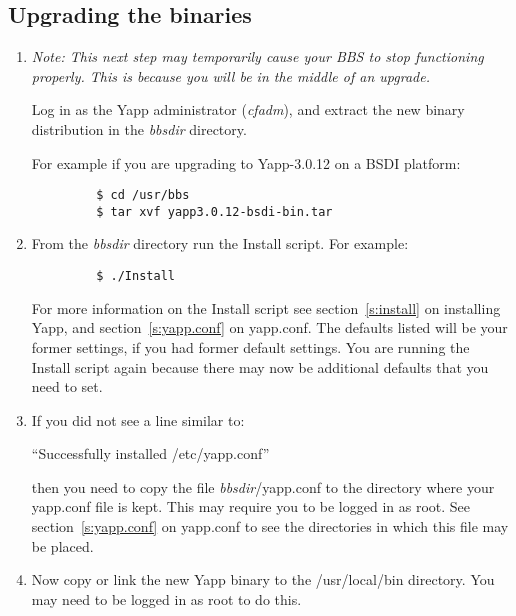 \documentclass[twoside]{report}
\begin{document}
   \subsection{Upgrading the binaries}
      \begin{enumerate}
      \item {\em Note: This next step may temporarily cause your BBS to stop
         functioning properly.  This is because you will be in the middle 
         of an upgrade.}
   
         Log in as the Yapp administrator ({\em cfadm}), and extract the
         new binary distribution in the {\it bbsdir} directory.
   
         For example if you are upgrading to Yapp-3.0.12 on a BSDI platform:
         \begin{verbatim}
         $ cd /usr/bbs
         $ tar xvf yapp3.0.12-bsdi-bin.tar
         \end{verbatim}
         \vspace{-12pt}
   
      \item From the {\em bbsdir} directory run the Install script.  
         For example:
         \begin{verbatim}
         $ ./Install
         \end{verbatim}
         \vspace{-12pt}
   
         For more information on the Install script see section~\ref{s:install} 
         on installing Yapp, and section~\ref{s:yapp.conf} on yapp.conf.  
         The defaults listed will be your former settings, if you had former
         default settings.  You are running the Install script again because 
         there may now be additional defaults that you need to set.
   
      \item If you did not see a line similar to:
   
            ``Successfully installed /etc/yapp.conf''
   
         then you need to copy the file {\em bbsdir}/yapp.conf to the directory 
         where your yapp.conf file is kept.  This may require you to be 
         logged in as root.  See section~\ref{s:yapp.conf} on yapp.conf
         to see the directories in which this file may be placed.
   
      \item Now copy or link the new Yapp binary to the /usr/local/bin 
         directory.  You may need to be logged in as root to do this.
   

\end{enumerate}
\end{document}
